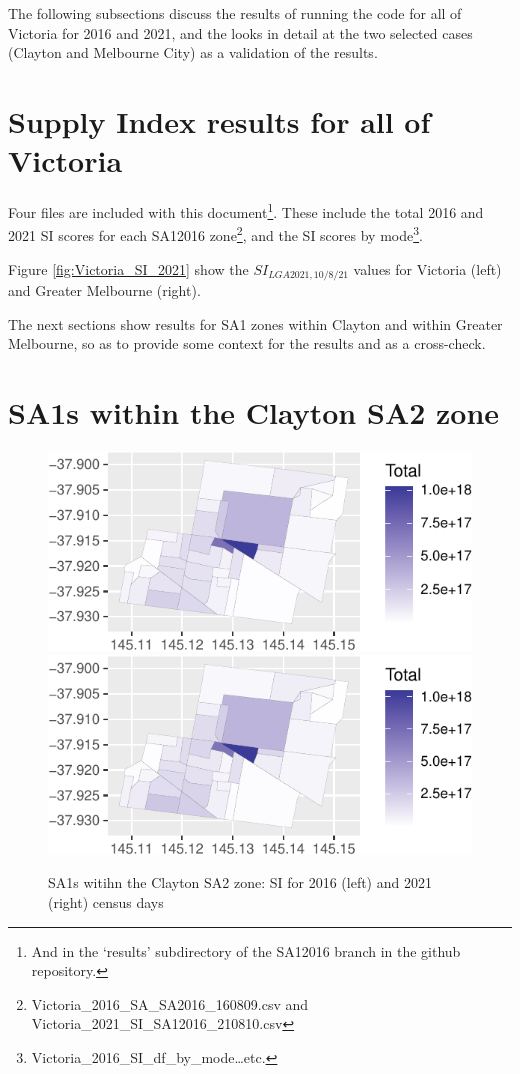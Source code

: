 \documentclass[]{tufte-book}
\begin{document}
The following subsections discuss the results of running the code for
all of Victoria for 2016 and 2021, and the looks in detail at the two
selected cases (Clayton and Melbourne City) as a validation of the
results.

\hypertarget{supply-index-results-for-all-of-victoria}{%
\section{Supply Index results for all of
Victoria}\label{supply-index-results-for-all-of-victoria}}

Four files are included with this document\footnote{And in the `results'
  subdirectory of the SA12016 branch in the github repository.}. These
include the total 2016 and 2021 SI scores for each SA12016
zone\footnote{Victoria\_2016\_SA\_SA2016\_160809.csv and
  Victoria\_2021\_SI\_SA12016\_210810.csv}, and the SI scores by
mode\footnote{Victoria\_2016\_SI\_df\_by\_mode\ldots etc.}.

Figure \ref{fig:Victoria_SI_2021} show the \(SI_{LGA2021, 10/8/21}\)
values for Victoria (left) and Greater Melbourne (right).

The next sections show results for SA1 zones within Clayton and within
Greater Melbourne, so as to provide some context for the results and as
a cross-check.

\hypertarget{sa1s-within-the-clayton-sa2-zone}{%
\section{SA1s within the Clayton SA2
zone}\label{sa1s-within-the-clayton-sa2-zone}}

\begin{figure}
\includegraphics[width=0.5\linewidth]{Reynolds_Currie_2024_transit_supply_index_GTFS_files/figure-latex/Clayton_SI_2016_and_2021_maps-1} \includegraphics[width=0.5\linewidth]{Reynolds_Currie_2024_transit_supply_index_GTFS_files/figure-latex/Clayton_SI_2016_and_2021_maps-2} \caption[SA1s witihn the Clayton SA2 zone]{SA1s witihn the Clayton SA2 zone: SI for 2016 (left) and 2021 (right) census days}\label{fig:Clayton_SI_2016_and_2021_maps}
\end{figure}
\end{document}
